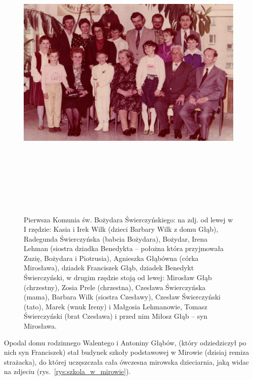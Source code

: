 \begin{figure}
	\begin{center}
		\includegraphics[height=150mm]{zdjecia/komunia_bozydara_swierczynskiego_zbiorowe.jpg}
		\caption[Pierwsza Komunia św. Bożydara Świerczyńskiego -- zdjęcie zbiorowe]{Pierwsza Komunia św. Bożydara Świerczyńskiego: na zdj. od lewej w I rzędzie: Kasia i Irek Wilk (dzieci Barbary Wilk z domu Głąb), Radegunda Świerczyńska (babcia Bożydara), Bożydar, Irena Lehman (siostra dziadka Benedykta -- położna która przyjmowała Zuzię, Bożydara i Piotrusia), Agnieszka Głąbówna (córka Mirosława), dziadek Franciszek Głąb, dziadek Benedykt Świerczyński, w drugim rzędzie stoją od lewej: Mirosław Głąb (chrzestny), Zosia Prele (chrzestna), Czesława Świerczyńska (mama), Barbara Wilk (siostra Czesławy), Czesław Świerczyński (tato), Marek (wnuk Ireny) i Małgosia Lehmanowie, Tomasz Świerczyński (brat Czesława) i przed nim Miłosz Głąb -- syn Mirosława.}
		\label{rys:komunia_bozydara_swierczynskiego_zbiorowe}
	\end{center}
\end{figure}

Opodal domu rodzinnego Walentego i Antoniny Głąbów, (który odziedziczył po nich syn Franciszek) stał budynek szkoły podstawowej w Mirowie (dzisiaj remiza strażacka), do której uczęszczała cała ówczesna mirowska dzieciarnia, jaką widac na zdjeciu (rys.~\ref{rys:szkola_w_mirowie}).

